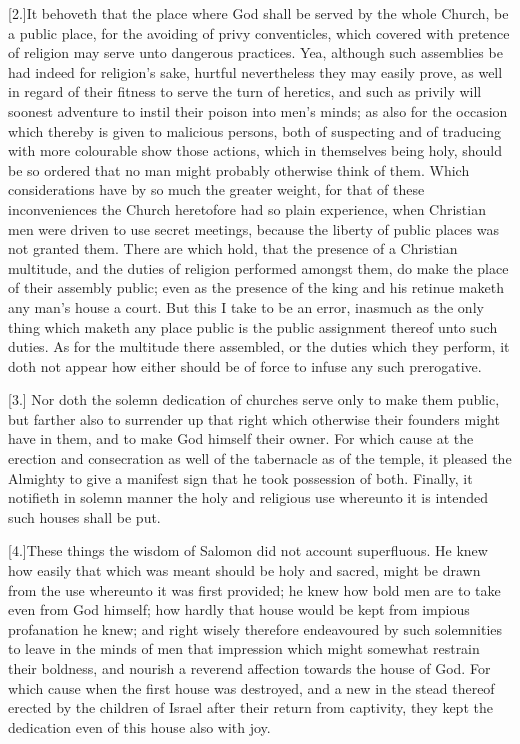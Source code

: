 [2.]It behoveth that the place where God shall be served by the whole Church, be a public place, for the avoiding of privy conventicles, which covered with pretence of religion may serve unto dangerous practices. Yea, although such assemblies be had indeed for religion’s sake, hurtful nevertheless they may easily prove, as well in regard of their fitness to serve the turn of heretics, and such as privily will soonest adventure to instil their poison into men’s minds; as also for the occasion which thereby is given to malicious persons, both of suspecting and of traducing with more colourable show those actions, which in themselves being holy, should be so ordered that no man might probably otherwise think of them. Which considerations have by so much the greater weight, for that of these inconveniences the Church heretofore had so plain experience, when Christian men were driven to use secret meetings, because the liberty of public places was not granted them. There are which hold, that the presence of a Christian multitude, and the duties of religion performed amongst them, do make the place of their assembly public; even as the presence of the king and his retinue maketh any man’s house a court. But this I take to be an error, inasmuch as the only thing which maketh any place public is the public assignment thereof unto such duties. As for the multitude there assembled, or the duties which they perform, it doth not appear how either should be of force to infuse any such prerogative.



[3.]
 Nor doth the solemn dedication of churches serve only to make them public, but farther also to surrender up that right which otherwise their founders might have in them, and to make God himself their owner. For which cause at the erection and consecration as well of the tabernacle as of the temple, it pleased the Almighty to give a manifest sign that he took possession of both. Finally, it notifieth in solemn manner the holy and religious use whereunto it is intended such houses shall be put.

[4.]These things the wisdom of Salomon did not account superfluous. He knew how easily that which was meant should be holy and sacred, might be drawn from the use whereunto it was first provided; he knew how bold men are to take even from God himself; how hardly that house would be kept from impious profanation he knew; and right wisely therefore endeavoured by such solemnities to leave in the minds of men that impression which might somewhat restrain their boldness, and nourish a reverend affection towards the house of God. For which cause when the first house was destroyed, and a new in the stead thereof erected by the children of Israel after their return from captivity, they kept the dedication even of this house also with joy.

